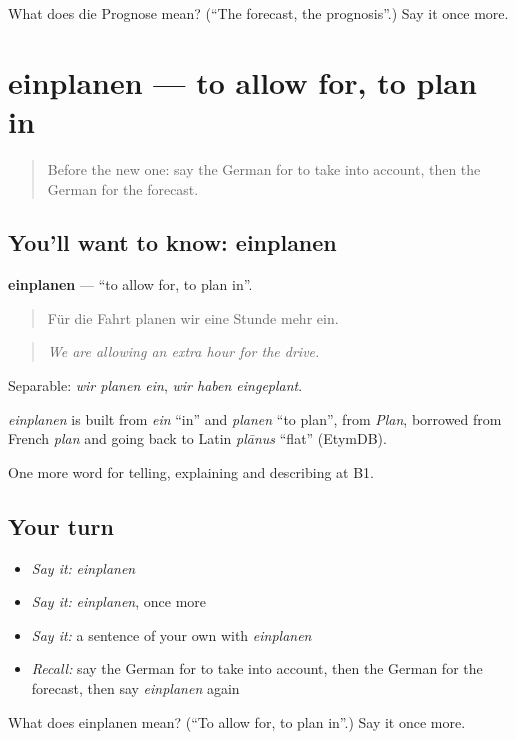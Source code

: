 \begin{tcolorbox}[breakable,colback=teal!4,colframe=teal!35!black,title={Before you move on}]
What does die Prognose mean? (\textquotedblleft{}The forecast, the prognosis\textquotedblright{}.) Say it once more.
\end{tcolorbox}
\section[einplanen]{einplanen — to allow for, to plan in}

\label{lesson:GE-C373-einplanen}



\begin{quote}
Before the new one: say the German for to take into account, then the German for the forecast.
\end{quote}

\subsection*{You'll want to know: einplanen}
\textbf{einplanen} — \textquotedblleft{}to allow for, to plan in\textquotedblright{}.

\begin{quote}
Für die Fahrt planen wir eine Stunde mehr ein.
\end{quote}

\begin{quote}
\emph{We are allowing an extra hour for the drive.}
\end{quote}

Separable: \emph{wir planen ein}, \emph{wir haben eingeplant}.

\begin{cousinweb}
\emph{einplanen} is built from \emph{ein} \textquotedblleft{}in\textquotedblright{} and \emph{planen} \textquotedblleft{}to plan\textquotedblright{}, from \emph{Plan}, borrowed from French \emph{plan} and going back to Latin \emph{plānus} \textquotedblleft{}flat\textquotedblright{} (EtymDB).
\end{cousinweb}

\begin{grammarlens}[title={What you've built}]
One more word for telling, explaining and describing at B1.
\end{grammarlens}

\subsection*{Your turn}
\begin{itemize}
\raggedright
  \item \emph{Say it:} \emph{einplanen}
  \item \emph{Say it:} \emph{einplanen}, once more
  \item \emph{Say it:} a sentence of your own with \emph{einplanen}
  \item \emph{Recall:} say the German for to take into account, then the German for the forecast, then say \emph{einplanen} again
\end{itemize}

\begin{tcolorbox}[breakable,colback=teal!4,colframe=teal!35!black,title={Before you move on}]
What does einplanen mean? (\textquotedblleft{}To allow for, to plan in\textquotedblright{}.) Say it once more.
\end{tcolorbox}
